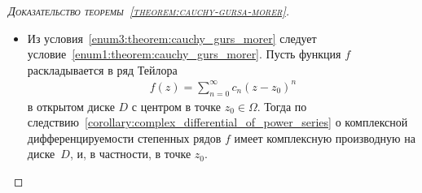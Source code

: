 \documentclass[../complex-analysis.tex]{subfiles}
\begin{document}
\begin{proof}[\normalfont\textsc{Доказательство теоремы~\ref{theorem:cauchy-gursa-morer}}]
\begin{itemize}
   Далее, дробь $ 1/(z-b) $ можно разложить в сумму геометрической прогрессии:
   \begin{align}
    \label{eq:sum_geom_series:cauchy_gurs_morer}
    \frac{1}{z-b} = \frac{1}{(z-a)+(a-b)} = \frac{1}{z-a} \cdot \frac{1}{1 - \frac{b-a}{z-a}} = \sum_{n=0}^{\infty} \frac{(b-a)^{n}}{(z-a)^{n+1}}.
   \end{align} Ряд~\eqref{eq:sum_geom_series:cauchy_gurs_morer} сходится для всех $ z \in C_\rho $, причём равномерно по $ z $, ведь
   \begin{align*}
    \left| \frac{b-a}{z-a} \right| = \frac{\left| b-a \right|}{\rho} < 1,
   \end{align*} причём равномерность не нарушится после умножения на $ f(z) $. Подставим полученное в \eqref{eq:cauchy_formula:cauchy_gurs_morer}:
   \begin{align*}
    f(b) &= \frac{1}{2\pi i} \int_{C_\rho} f(z) \cdot \sum_{n=0}^{\infty}\frac{(b-a)^{n}}{(z-a)^{n+1}}.
   \end{align*} Так как ряд~\eqref{eq:sum_geom_series:cauchy_gurs_morer} сходится равномерно (всё суммируемо), то по теореме Фубини можно поменять местами сумму и интеграл. Получаем
   \begin{align}
    \label{eq:taylor_series:cauchy_gurs_morer}
    f(b) = \sum_{n=0}^{\infty} c_n (b-a)^{n},
   \end{align} где
   \begin{align*}
    c_n = \frac{1}{2\pi i} \int_{C_\rho} \frac{f(z)\,dz}{(z-a)^{n+1}}.
   \end{align*} Равенство~\eqref{eq:taylor_series:cauchy_gurs_morer} верно для любого $ b \in B(a,\rho) $.

   {\color{red} Почему коэффициенты $ c_n $ не зависят от $ \rho $?}

   Теперь можно устремить $ \rho \to r $ и получить равенство~\eqref{eq:taylor_series:cauchy_gurs_morer} на всём диске $ D $.

  \item Из условия~\ref{enum3:theorem:cauchy_gurs_morer} следует условие~\ref{enum1:theorem:cauchy_gurs_morer}. Пусть функция $ f $ раскладывается в ряд Тейлора
   \begin{align*}
    f(z) = \sum_{n=0}^{\infty} c_n(z-z_0)^{n}
   \end{align*} в открытом диске $ D $ с центром в точке $ z_0 \in \Omega $. Тогда по следствию~\ref{corollary:complex_differential_of_power_series} о комплексной дифференцируемости степенных рядов $ f $ имеет комплексную производную на диске~$ D $, и, в частности, в точке $ z_0 $.


\end{itemize}
\end{proof}
\end{document}
